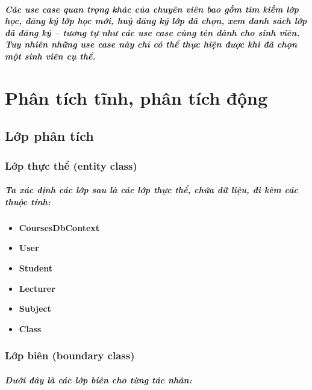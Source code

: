 \documentclass[12pt]{book}
\begin{document}
  \paragraph{\textnormal{
    Các use case quan trọng khác của chuyên viên bao gồm \textit{tìm kiếm lớp học}, \textit{đăng ký lớp học mới}, \textit{huỷ đăng ký lớp đã chọn}, \textit{xem danh sách lớp đã đăng ký} -- tương tự như các use case cùng tên dành cho \textit{sinh viên}. Tuy nhiên những use case này chỉ có thể thực hiện được khi đã chọn một sinh viên cụ thể.
  }}




\chapter{Phân tích tĩnh, phân tích động}

  \section{Lớp phân tích}

    \subsection{Lớp thực thể (entity class)}
    \paragraph{\textnormal{
      Ta xác định các lớp sau là các lớp thực thể, chứa dữ liệu, đi kèm các thuộc tính:
    }}

    \begin{itemize}
      \item \textbf{CoursesDbContext}
      \item \textbf{User}
      \item \textbf{Student}
      \item \textbf{Lecturer}
      \item \textbf{Subject}
      \item \textbf{Class}
    \end{itemize}

    \subsection{Lớp biên (boundary class)}
    \paragraph{\textnormal{
      Dưới đây là các lớp biên cho từng tác nhân:
    }}
\end{document}
